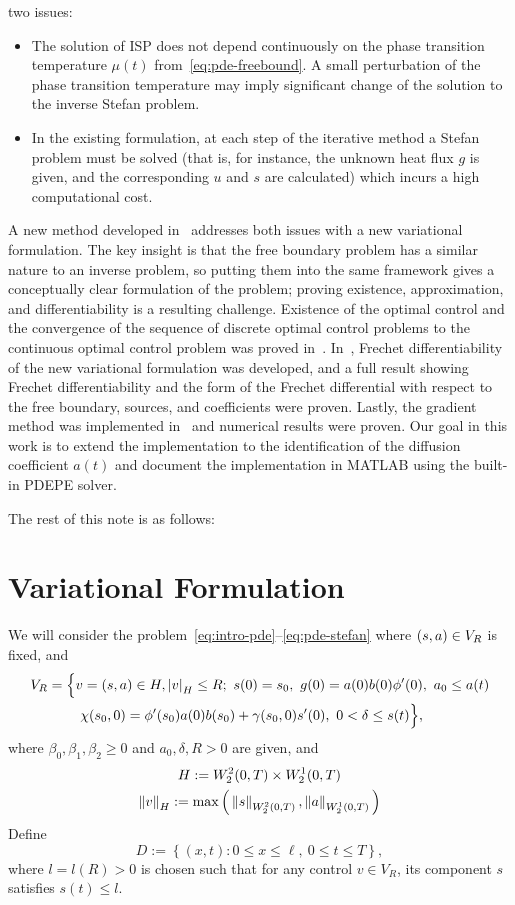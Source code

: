 \documentclass[letterpaper, 10pt, draft]{amsart}
\theoremstyle{definition}
\theoremstyle{remark}
\newcommand{\bk}[1]{\left\{#1\right\}}
\newcommand{\norm}[1]{\left\Vert #1\right\Vert}%
\newcommand{\lnorm}[1]{\left\vert #1\right\vert}%
\let\l\ell%
\begin{document}
two issues:
\begin{itemize}
    \item The solution of ISP does not depend continuously on the phase
      transition temperature $\mu(t)$ from~\eqref{eq:pde-freebound}.
    A small perturbation of the phase transition temperature may imply
    significant change of the solution to the inverse Stefan problem.
    \item In the existing formulation, at each step of the iterative method a
      Stefan problem must be solved (that is, for instance, the unknown heat
      flux $g$ is given, and the corresponding $u$ and $s$ are calculated) which
      incurs a high computational cost.
\end{itemize}

A new method developed in~\cite{abdulla13,abdulla15} addresses both issues with
a new variational formulation.
The key insight is that the free boundary problem has a similar nature to an
inverse problem, so putting them into the same framework gives a conceptually
clear formulation of the problem; proving existence, approximation, and
differentiability is a resulting challenge.
Existence of the optimal control and the convergence of the sequence of discrete
optimal control problems to the continuous optimal control problem was proved
in~\cite{abdulla13,abdulla15}.
In~\cite{abdulla16,abdulla17}, Frechet differentiability of the new variational
formulation was developed, and a full result showing Frechet differentiability
and the form of the Frechet differential
with respect to the free boundary, sources, and coefficients were proven.
Lastly, the gradient method was implemented in~\cite{abdulla18} and numerical
results were proven.
Our goal in this work is to extend the implementation to the identification of
the diffusion coefficient $a(t)$ and document the implementation in MATLAB using the built-in PDEPE solver.

The rest of this note is as follows:

\section{Variational Formulation}\label{sec:variational-formulation}
We will consider the problem~\eqref{eq:intro-pde}--\eqref{eq:pde-stefan} where $(s, a{}) \in V_R$ is fixed, and
\begin{align}
  V_R & =\Big\{
        v=(\controlvars{}) \in H, \lnorm{v}_H \leq R;
        ~s(0) = s_0,
        ~g(0) = a(0)b(0) \phi'(0),
        ~a_0 \leq a(t)\nonumber
  \\
      & \qquad
        ~\chi(s_{0},0) = \phi'(s_{0})a(0)b(s_0) + \gamma(s_0, 0)s'(0),
        ~0 < \delta \leq s(t)
        \Big\},\label{eq:control-set}
\end{align}
where $\beta_0, \beta_1, \beta_2 \geq 0$ and $a_0, \delta, R > 0$ are given, and
\begin{gather*}
  H := \controlSpace{}
    \\
    \norm{v}_H := \controlSpaceNorm{}
  \end{gather*}
  Define
\[
  D := \bk{(x,t) : 0\leq x\leq \l,~ 0\leq t\leq T},
\]
where $l = l(R) > 0$ is chosen such that for any control $v\in V_R$, its component
$s$ satisfies $s(t)\leq l$.
\end{document}
